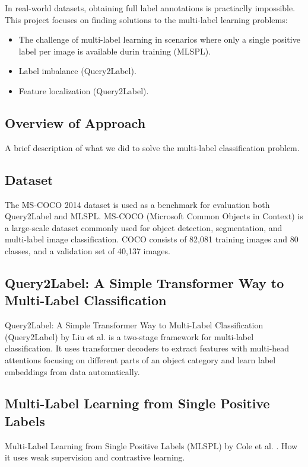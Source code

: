 \documentclass[lettersize,journal]{IEEEtran}
\begin{document}
In real-world datasets, obtaining full label annotations is practiaclly impossible.
This project focuses on finding solutions to the multi-label learning problems:
\begin{itemize} 
    \item  The challenge of multi-label learning in scenarios where only a single positive label per image is available durin training (MLSPL).
    \item Label imbalance (Query2Label).
    \item Feature localization (Query2Label).
\end{itemize}

\subsection{Overview of Approach}
A brief description of what we did to solve the multi-label classification problem. 

\subsection{Dataset}
The MS-COCO 2014 \cite{coco14} dataset is used as a benchmark for evaluation both Query2Label and MLSPL. MS-COCO (Microsoft Common Objects in Context) is a large-scale dataset commonly used for object detection, segmentation, and multi-label image classification. COCO consists of 82,081 training images and 80 classes, and a validation set of 40,137 images.

\subsection{Query2Label: A Simple Transformer Way to Multi-Label Classification}
\label{sec:q2l_method}
Query2Label: A Simple Transformer Way to Multi-Label Classification (Query2Label) by Liu et al. \cite{Query2Label} is a two-stage framework for multi-label classification. It uses transformer decoders to extract features with multi-head attentions focusing on different parts of an object category and learn label embeddings from data automatically.

\subsection{Multi-Label Learning from Single Positive Labels}
Multi-Label Learning from Single Positive Labels (MLSPL) by Cole et al. \cite{mlsp}.
How it uses weak supervision and contrastive learning.
\end{document}
